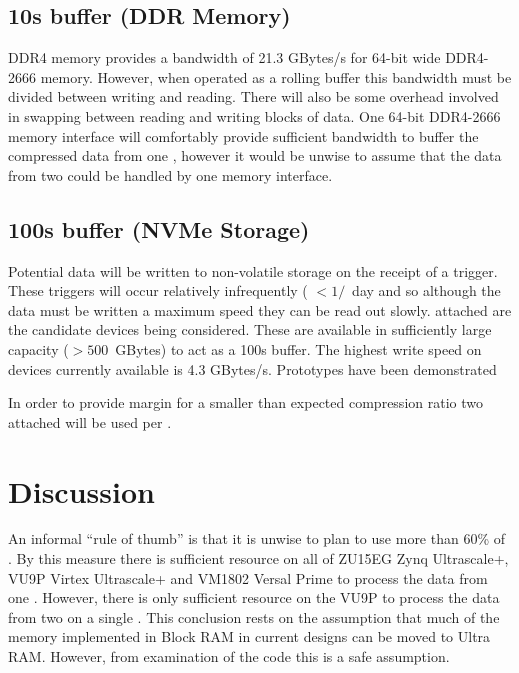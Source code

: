 \documentclass{article}
\begin{document}
\subsection{10s buffer (DDR Memory)}

DDR4 memory provides a bandwidth of 21.3 GBytes/s for 64-bit wide DDR4-2666 memory. However, when operated as a rolling buffer this bandwidth must be divided between writing and reading. There will also be some overhead involved in swapping between reading and writing blocks of data. One 64-bit DDR4-2666 memory interface will comfortably provide sufficient bandwidth to buffer the  compressed data from one  , however it would be unwise to assume that the data from two  could be handled by one memory interface.

\subsection{100s buffer (NVMe Storage)}

Potential  data will be written to non-volatile storage on the receipt of a  trigger. These triggers will occur relatively infrequently ( $< 1/$~day and so although the data must be written a maximum speed they can be read out slowly.  attached  are the candidate devices being considered. These  are available in sufficiently large capacity ($> 500$~GBytes) to act as a 100s buffer. The highest write speed on devices currently available is 4.3 GBytes/s\cite{ref:AORUS-NVMe-Gen4-SSD-1TB}. Prototypes have been demonstrated 

In order to provide margin for a smaller than expected compression ratio two  attached  will be used per .



\section{Discussion}

An informal ``rule of thumb'' is that it is unwise to plan to use more than 60\% of . By this measure there is sufficient resource on all of ZU15EG Zynq Ultrascale+, VU9P Virtex Ultrascale+ and VM1802 Versal Prime to process the data from one . However, there is only sufficient resource on the VU9P to process the data from two  on a single . This conclusion rests on the assumption that much of the memory implemented in Block RAM in current designs can be moved to Ultra RAM. However, from examination of the code this is a safe assumption. 
\end{document}
